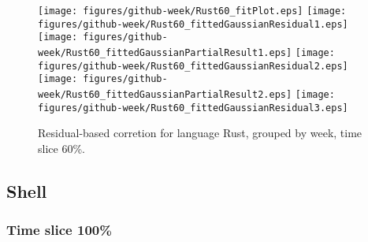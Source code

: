 \begin{figure}[hb]
\centering
{}
{\texttt{[image: figures/github-week/Rust60\_fitPlot.eps]}}
{\texttt{[image: figures/github-week/Rust60\_fittedGaussianResidual1.eps]}}
{\texttt{[image: figures/github-week/Rust60\_fittedGaussianPartialResult1.eps]}}
{\texttt{[image: figures/github-week/Rust60\_fittedGaussianResidual2.eps]}}
{\texttt{[image: figures/github-week/Rust60\_fittedGaussianPartialResult2.eps]}}
{\texttt{[image: figures/github-week/Rust60\_fittedGaussianResidual3.eps]}}
\caption{Residual-based corretion for language Rust, grouped by week, time slice 60\%.}
\end{figure}


\clearpage 
\newpage 


\subsection{Shell}

\FloatBarrier

\subsubsection{Time slice 100\%}

